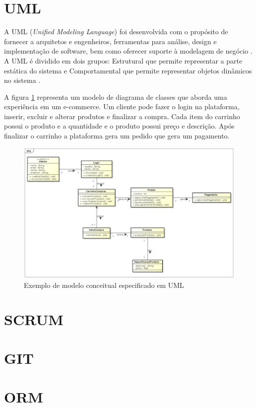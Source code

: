 \section{UML}
A UML (\textit{Unified Modeling Language}) foi desenvolvida com o propósito de fornecer a
arquitetos e engenheiros, ferramentas para análise, design e implementação de software, bem
como oferecer suporte à modelagem de negócio \cite{gasparini2018driv}. A UML é dividido em dois grupos: Estrutural que permite representar a parte estática do sistema e Comportamental que permite representar objetos dinâmicos no sistema \cite{silva2018sasml}.

A figura \ref{Exemplo_UML} representa um modelo de diagrama de classes que aborda uma experiência em um e-commerce. Um cliente pode fazer o login na plataforma, inserir, excluir e alterar produtos e finalizar a compra. Cada item do carrinho possui o produto e a quantidade e o produto possui preço e descrição.
Após finalizar o carrinho a plataforma gera um pedido que gera um pagamento.
\begin{figure}[htb]
	\caption{\label{Exemplo_UML} Exemplo de modelo conceitual especificado em UML}
	\begin{center}
		\includegraphics[scale=0.45]{./Figuras/Exemplo_UML.png}
	\end{center}
\end{figure}


\section{SCRUM}

\section{GIT}

\section{ORM}